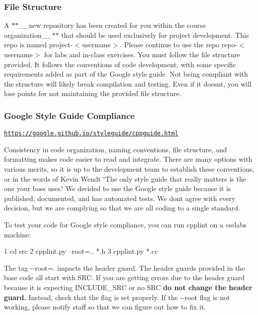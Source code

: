 \subsubsection*{File Structure}

A $\ast$$\ast$\+\_\+\+\_\+new repository has been created for you within the course organization\+\_\+\+\_\+$\ast$$\ast$ that should be used exclusively for project development. This repo is named {\ttfamily project-\/$<$username$>$}. Please continue to use the repo {\ttfamily repo-\/$<$username$>$} for labs and in-\/class exercises. You must follow the file structure provided. It follows the conventions of code development, with some specific requirements added as part of the Google style guide. Not being compliant with the structure will likely break compilation and testing. Even if it doesn\textquotesingle{}t, you will lose points for not maintaining the provided file structure.

\subsubsection*{Google Style Guide Compliance}

\href{https://google.github.io/styleguide/cppguide.html}{\tt https\+://google.\+github.\+io/styleguide/cppguide.\+html}

Consistency in code organization, naming conventions, file structure, and formatting makes code easier to read and integrate. There are many options with various merits, so it is up to the development team to establish these conventions, or in the words of Kevin Wendt \char`\"{}\+The only style guide that really matters is the one your boss uses.\char`\"{} We decided to use the Google style guide because it is published, documented, and has automated tests. We don\textquotesingle{}t agree with every decision, but we are complying so that we are all coding to a single standard.

To test your code for Google style compliance, you can run cpplint on a cselabs machine\+:


\begin{DoxyCode}
1 cd src
2 cpplint.py --root=.. *.h
3 cpplint.py *.cc
\end{DoxyCode}


The tag {\ttfamily -\/-\/root=.} impacts the header guard. The header guards provided in the base code all start with {\ttfamily S\+RC}. If you are getting errors due to the header guard because it is expecting {\ttfamily I\+N\+C\+L\+U\+D\+E\+\_\+\+S\+RC} or no {\ttfamily S\+RC} {\bfseries do not change the header guard.} Instead, check that the flag is set properly. If the {\ttfamily -\/-\/root} flag is not working, please notify staff so that we can figure out how to fix it.

